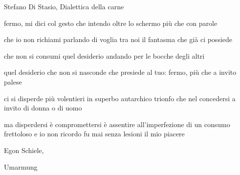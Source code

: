 \clearpage


\begin{artItem}
	Stefano Di Stasio, Dialettica della carne
\end{artItem}

\begin{poem}
	\begin{stanza}
		fermo, mi dici\verseline
		col gesto che intendo\verseline
		oltre lo schermo\verseline
		più che con parole
	\end{stanza}

	\begin{stanza}
		che io non richiami\verseline
		parlando di voglia\verseline
		tra noi il fantasma\verseline
		che già ci possiede
	\end{stanza}

	\begin{stanza}
		che non si consumi\verseline
		quel desiderio\verseline
		andando per le bocche\verseline
		degli altri
	\end{stanza}

	\begin{stanza}
		quel desiderio \verseline
		che non si nasconde\verseline
		che presiede al tuo: fermo,\verseline
		più che a invito palese
	\end{stanza}
\end{poem}

\clearpage


\begin{poem}
	\begin{stanza}
		ci si disperde più volentieri\verseline
		in superbo autarchico trionfo\verseline
		che nel concedersi a invito di donna o di uomo
	\end{stanza}

	\begin{stanza}
		ma disperdersi è compromettersi\verseline
		è assentire all'imperfezione di un consumo frettoloso\verseline
		e io non ricordo fu mai senza lesioni il mio piacere
	\end{stanza}
\end{poem}

\clearpage


\begin{artItem}
	Egon Schiele, \begin{otherlanguage}{german}%
		Umarmung%
	\end{otherlanguage}
\end{artItem}

